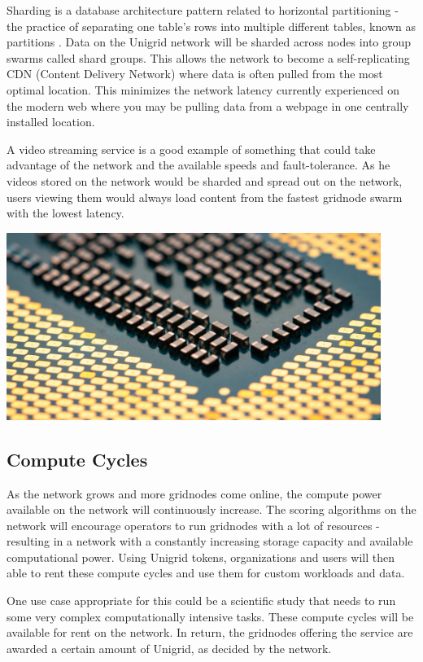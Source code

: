 \documentclass{article}
\begin{document}
Sharding is a database architecture pattern related to horizontal partitioning - the practice of separating one table’s rows into multiple different tables, known as partitions \cite{mark2019}. Data on the Unigrid network will be sharded across nodes into group swarms called shard groups. This allows the network to become a self-replicating CDN (Content Delivery Network) where data is often pulled from the most optimal location. This minimizes the network latency currently experienced on the modern web where you may be pulling data from a webpage in one centrally installed location.

A video streaming service is a good example of something that could take advantage of the network and the available speeds and fault-tolerance. As he videos stored on the network would be sharded and spread out on the network, users viewing them would always load content from the fastest gridnode swarm with the lowest latency.

\begin{mdframed}[style=textimage]
	\includegraphics[width=345pt]{compute}
\end{mdframed}

\subsection{Compute Cycles}
As the network grows and more gridnodes come online, the compute power available on the network will continuously increase. The scoring algorithms on the network will encourage operators to run gridnodes with a lot of resources - resulting in a network with a constantly increasing storage capacity and available computational power. Using Unigrid tokens, organizations and users will then able to rent these compute cycles and use them for custom workloads and data.

One use case appropriate for this could be a scientific study that needs to run some very complex computationally intensive tasks. These compute cycles will be available for rent on the network. In return, the gridnodes offering the service are awarded a certain amount of Unigrid, as decided by the network. 
\end{document}
